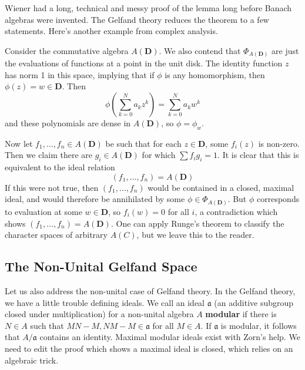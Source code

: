 Wiener had a long, technical and messy proof of the lemma long before Banach algebras were invented. The Gelfand theory reduces the theorem to a few statements. Here's another example from complex analysis.

\begin{example}
    Consider the commutative algebra $A(\mathbf{D})$. We also contend that $\Phi_{A(\mathbf{D})}$ are just the evaluations of functions at a point in the unit disk. The identity function $z$ has norm 1 in this space, implying that if $\phi$ is any homomorphism, then $\phi(z) = w \in \mathbf{D}$. Then
    \[ \phi(\sum_{k = 0}^N a_k z^k) = \sum_{k = 0}^N a_k w^k \]
    and these polynomials are dense in $A(\mathbf{D})$, so $\phi = \phi_w$.

    Now let $f_1, \dots, f_n \in A(\mathbf{D})$ be such that for each $z \in \mathbf{D}$, some $f_i(z)$ is non-zero. Then we claim there are $g_i \in A(\mathbf{D})$ for which $\sum f_i g_i = 1$. It is clear that this is equivalent to the ideal relation
    \[ (f_1, \dots, f_n) = A(\mathbf{D}) \]
    If this were not true, then $(f_1, \dots, f_n)$ would be contained in a closed, maximal ideal, and would therefore be annihilated by some $\phi \in \Phi_{A(\mathbf{D})}$. But $\phi$ corresponds to evaluation at some $w \in \mathbf{D}$, so $f_i(w) = 0$ for all $i$, a contradiction which shows $(f_1, \dots, f_n) = A(\mathbf{D})$. One can apply Runge's theorem to classify the character spaces of arbitrary $A(C)$, but we leave this to the reader.
\end{example}

\subsection{The Non-Unital Gelfand Space}

Let us also address the non-unital case of Gelfand theory. In the Gelfand theory, we have a little trouble defining ideals. We call an ideal $\mathfrak{a}$ (an additive subgroup closed under multiplication) for a non-unital algebra $A$ {\bf modular} if there is $N \in A$ such that $MN - M, NM - M \in \mathfrak{a}$ for all $M \in A$. If $\mathfrak{a}$ is modular, it follows that $A/\mathfrak{a}$ contains an identity. Maximal modular ideals exist with Zorn's help. We need to edit the proof which shows a maximal ideal is closed, which relies on an algebraic trick.

